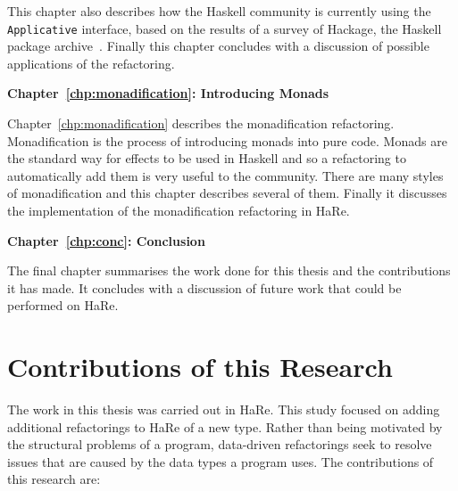 This chapter also describes how the Haskell community is currently using the \texttt{Applicative} interface, based on the results of a survey of Hackage, the Haskell package archive~\citep{hackage}. Finally this chapter concludes with a discussion of possible applications of the refactoring.

\textbf{Chapter~\ref{chp:monadification}: Introducing Monads} 

Chapter~\ref{chp:monadification} describes the monadification refactoring. Monadification is the process of introducing monads into pure code. Monads are the standard way for effects to be used in Haskell and so a refactoring to automatically add them is very useful to the community. There are many styles of monadification and this chapter describes several of them. Finally it discusses the implementation of the monadification refactoring in HaRe.

\textbf{Chapter~\ref{chp:conc}: Conclusion}

The final chapter summarises the work done for this thesis and the contributions it has made. It concludes with a discussion of future work that could be performed on HaRe.

\section{Contributions of this Research}

The work in this thesis was carried out in HaRe. This study focused on adding additional refactorings to HaRe of a new type. Rather than being motivated by the structural problems of a program, data-driven refactorings seek to resolve issues that are caused by the data types a program uses. The contributions of this research are:

